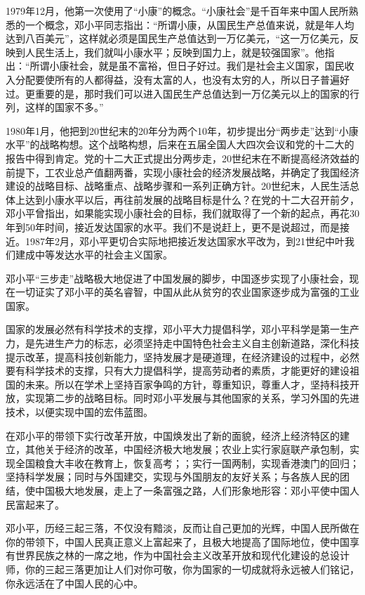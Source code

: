 \documentclass[cs4size,a4paper,nofonts]{ctexart}
\begin{document}
1979年12月，他第一次使用了“小康”的概念。“小康社会”是千百年来中国人民所熟悉的一个概念，邓小平同志指出：“所谓小康，从国民生产总值来说，就是年人均达到八百美元”，这样就必须是国民生产总值达到一万亿美元，“这一万亿美元，反映到人民生活上，我们就叫小康水平；反映到国力上，就是较强国家”。他指出：“所谓小康社会，就是虽不富裕，但日子好过。我们是社会主义国家，国民收入分配要使所有的人都得益，没有太富的人，也没有太穷的人，所以日子普遍好过。更重要的是，那时我们可以进入国民生产总值达到一万亿美元以上的国家的行列，这样的国家不多。”

1980年1月，他把到20世纪末的20年分为两个10年，初步提出分“两步走”达到“小康水平”的战略构想。这个战略构想，后来在五届全国人大四次会议和党的十二大的报告中得到肯定。党的十二大正式提出分两步走，20世纪末在不断提高经济效益的前提下，工农业总产值翻两番，实现小康社会的经济发展战略，并确定了我国经济建设的战略目标、战略重点、战略步骤和一系列正确方针。20世纪末，人民生活总体上达到小康水平以后，再往前发展的战略目标是什么？在党的十二大召开前夕，邓小平曾指出，如果能实现小康社会的目标，我们就取得了一个新的起点，再花30年到50年时间，接近发达国家的水平。我们不是说赶上，更不是说超过，而是接近。1987年2月，邓小平更切合实际地把接近发达国家水平改为，到21世纪中叶我们建成中等发达水平的社会主义国家。

邓小平“三步走”战略极大地促进了中国发展的脚步，中国逐步实现了小康社会，现在一切证实了邓小平的英名睿智，中国从此从贫穷的农业国家逐步成为富强的工业国家。

国家的发展必然有科学技术的支撑，邓小平大力提倡科学，邓小平科学是第一生产力，是先进生产力的标志，必须坚持走中国特色社会主义自主创新道路，深化科技提示改革，提高科技创新能力，坚持发展才是硬道理，在经济建设的过程中，必然要有科学技术的支撑，只有大力提倡科学，提高劳动者的素质，才能更好的建设祖国的未来。所以在学术上坚持百家争鸣的方针，尊重知识，尊重人才，坚持科技开放，实现第二步的战略目标。同时邓小平发展与其他国家的关系，学习外国的先进技术，以便实现中国的宏伟蓝图。

在邓小平的带领下实行改革开放，中国焕发出了新的面貌，经济上经济特区的建立，其他关于经济的改革，中国经济极大地发展；农业上实行家庭联产承包制，实现全国粮食大丰收在教育上，恢复高考；；实行一国两制，实现香港澳门的回归；坚持科学发展；同时与外国建交，实现与外国朋友的友好关系；与各族人民的团结，使中国极大地发展，走上了一条富强之路，人们形象地形容：邓小平使中国人民富起来了。

邓小平，历经三起三落，不仅没有黯淡，反而让自己更加的光辉，中国人民所做在你的带领下，中国人民真正意义上富起来了，且极大地提高了国际地位，使中国享有世界民族之林的一席之地，作为中国社会主义改革开放和现代化建设的总设计师，你的三起三落更加让人们对你可敬，你为国家的一切成就将永远被人们铭记，你永远活在了中国人民的心中。
\end{document}

